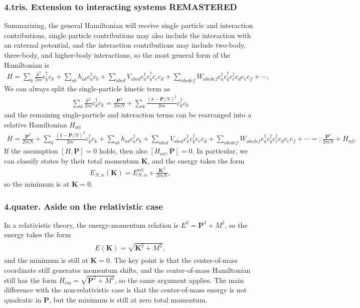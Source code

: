 \documentclass[../QFT_main.tex]{subfiles}
\begin{document}
\subsubsection*{4.tris. Extension to interacting systems REMASTERED}
Summarizing, the general Hamiltonian will receive single particle and interaction contributions, single particle contributions may also include the interaction with an external potential, and the interaction contributions may include two-body, three-body, and higher-body interactions, so the most general form of the Hamiltonian is
\begin{align}
   H= \sum_k \tfrac{k^2}{2m}c_k^\dagger c_k + \sum_{ab}h_{ab}c_a^\dagger c_b + \sum_{abcd}V_{abcd}c_a^\dagger c_b^\dagger c_c c_d + \sum_{abcdef}W_{abcdef}c_a^\dagger c_b^\dagger c_c^\dagger c_d c_e c_f + \cdots,
\end{align}
We can always split the single-particle kinetic term as
\begin{align}
   \sum_k \tfrac{k^2}{2m}c_k^\dagger c_k = \frac{\mathbf{P}^2}{2mN} + \sum_k \tfrac{(k-\mathbf{P}/N)^2}{2m}c_k^\dagger c_k
\end{align}
and the remaining single-particle and interaction terms can be rearranged into a relative Hamiltonian $H_{\text{rel}}$
\begin{align}
    H= \frac{\mathbf{P}^2}{2mN} + \sum_k \tfrac{(k-\mathbf{P}/N)^2}{2m}c_k^\dagger c_k + \sum_{ab}h_{ab}c_a^\dagger c_b + \sum_{abcd}V_{abcd}c_a^\dagger c_b^\dagger c_c c_d + \sum_{abcdef}W_{abcdef}c_a^\dagger c_b^\dagger c_c^\dagger c_d c_e c_f + \cdots =: \frac{\mathbf{P}^2}{2mN} + H_{\text{rel}}.
\end{align}
If the assumption $[H,\mathbf{P}]=0$ holds, then also $[H_{\text{rel}},\mathbf{P}]=0$.
In particular, we can classify states by their total momentum $\mathbf{K}$, and the energy takes the form
\begin{align}
    E_{N,\alpha}(\mathbf{K})=E^{\text{rel}}_{N,\alpha}+\frac{\mathbf{K}^2}{2mN},
\end{align}
so the minimum is at $\mathbf{K}=0$.

\subsubsection*{4.quater. Aside on the relativistic case}
In a relativistic theory, the energy-momentum relation is $E^2=\mathbf{P}^2+M^2$, so the energy takes the form
{\small\begin{align}
\begin{aligned}
    E(\mathbf{K})=\sqrt{\mathbf{K}^2+M^2},
\end{aligned}\end{align}}
and the minimum is still at $\mathbf{K}=0$.
The key point is that the center-of-mass coordinate still generates momentum shifts, and the center-of-mass Hamiltonian still has the form $H_{\text{cm}}=\sqrt{\mathbf{P}^2+M^2}$, so the same argument applies.
The main difference with the non-relativistic case is that the center-of-mass energy is not quadratic in $\mathbf{P}$, but the minimum is still at zero total momentum.
\end{document}
